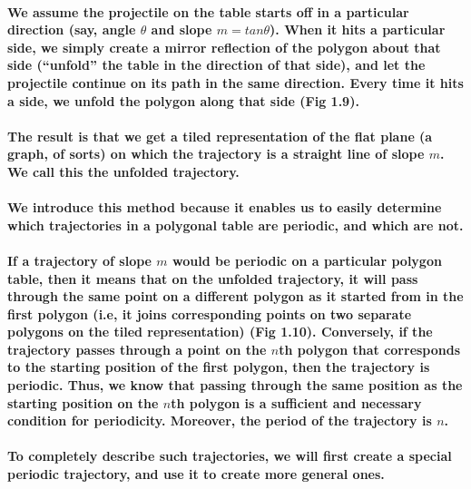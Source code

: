 \documentclass{article}
\begin{document}
\paragraph{We assume the projectile on the table starts off in a particular direction (say, angle $\theta$ and slope $m = tan\theta$). When it hits a particular side, we simply create a mirror reflection of the polygon about that side (“unfold” the table in the direction of that side), and let the projectile continue on its path in the same direction. Every time it hits a side, we unfold the polygon along that side (Fig 1.9).}


\paragraph{The result is that we get a tiled representation of the flat plane (a graph, of sorts) on which the trajectory is a straight line of slope $m$. We call this the unfolded trajectory.}

\paragraph{We introduce this method because it enables us to easily determine which trajectories in a polygonal table are periodic, and which are not.}


\paragraph{If a trajectory of slope $m$ would be periodic on a particular polygon table, then it means that on the unfolded trajectory, it will pass through the same point on a different polygon as it started from in the first polygon (i.e, it joins corresponding points on two separate polygons on the tiled representation) (Fig 1.10). Conversely, if the trajectory passes through a point on the $n$th polygon that corresponds to the starting position of the first polygon, then the trajectory is periodic. Thus, we know that passing through the same position as the starting position on the $n$th polygon is a sufficient and necessary condition for periodicity. Moreover, the period of the trajectory is $n$.}

\paragraph{To completely describe such trajectories, we will first create a special periodic trajectory, and use it to create more general ones.}
\end{document}
